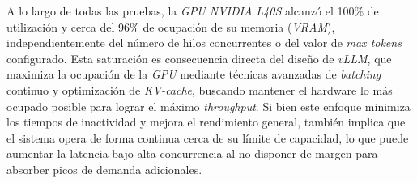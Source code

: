 


A lo largo de todas las pruebas, la \textit{GPU NVIDIA L40S} alcanzó el 100\% de utilización y cerca del 96\% de ocupación de su memoria (\textit{VRAM}), independientemente del número de hilos concurrentes o del valor de \textit{max tokens} configurado. Esta saturación es consecuencia directa del diseño de \textit{vLLM}, que maximiza la ocupación de la \textit{GPU} mediante técnicas avanzadas de \textit{batching} continuo y optimización de \textit{KV-cache}, buscando mantener el hardware lo más ocupado posible para lograr el máximo \textit{throughput}. Si bien este enfoque minimiza los tiempos de inactividad y mejora el rendimiento general, también implica que el sistema opera de forma continua cerca de su límite de capacidad, lo que puede aumentar la latencia bajo alta concurrencia al no disponer de margen para absorber picos de demanda adicionales.

